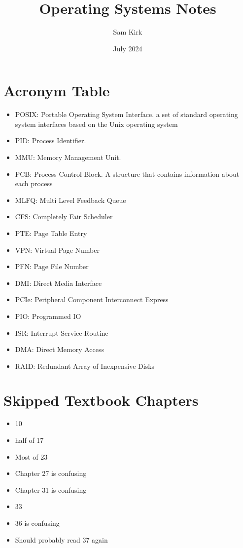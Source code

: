 \documentclass[12pt, letterpaper]{article}
\title{Operating Systems Notes}
\author{Sam Kirk}
\date{July 2024}
\begin{document}
\maketitle

\section*{Acronym Table}
\begin{itemize}
    \item POSIX: Portable Operating System Interface. a set of standard operating system interfaces based on the Unix operating system
    \item PID: Process Identifier. 
    \item MMU: Memory Management Unit.
    \item PCB: Process Control Block. A structure that contains information about each process
    \item MLFQ: Multi Level Feedback Queue 
    \item CFS: Completely Fair Scheduler
    \item PTE: Page Table Entry 
    \item VPN: Virtual Page Number 
    \item PFN: Page File Number 
    \item DMI: Direct Media Interface 
    \item PCIe: Peripheral Component Interconnect Express
    \item PIO: Programmed IO 
    \item ISR: Interrupt Service Routine 
    \item DMA: Direct Memory Access 
    \item RAID: Redundant Array of Inexpensive Disks
\end{itemize}

\section*{Skipped Textbook Chapters}
\begin{itemize}
    \item 10 
    \item half of 17
    \item Most of 23 
    \item Chapter 27 is confusing 
    \item Chapter 31 is confusing 
    \item 33 
    \item 36 is confusing 
    \item Should probably read 37 again 
\end{itemize}
\end{document}
